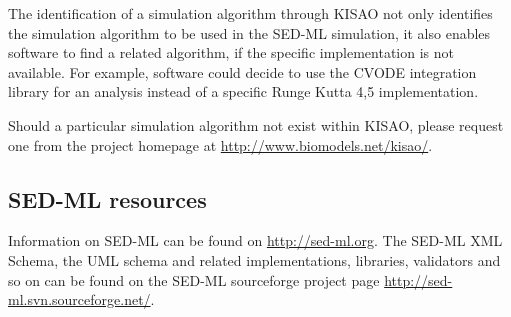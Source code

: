 The identification of a simulation algorithm through KISAO not only 
identifies the simulation algorithm to be used in the SED-ML simulation, 
it also enables software to find a related algorithm, if the specific 
implementation is not available. For example, software could decide to 
use the CVODE integration library for an analysis instead of a specific 
Runge Kutta 4,5 implementation. 

Should a particular simulation algorithm not exist within KISAO, please 
request one from the project homepage at 
\url{http://www.biomodels.net/kisao/}.

\subsection{SED-ML resources}
\label{sec:resources}

Information on SED-ML can be found on \url{http://sed-ml.org}. The SED-ML XML Schema, the UML schema and related implementations, libraries, validators and so on can be found on the SED-ML sourceforge project page \url{http://sed-ml.svn.sourceforge.net/}.

